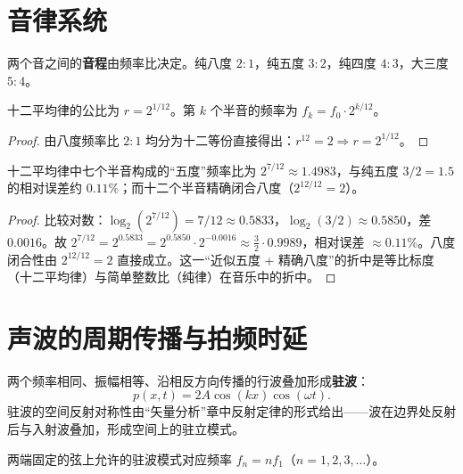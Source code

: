 \section{音律系统}

\begin{definition}[音程与频率比]\label{def:musical_interval}
两个音之间的\textbf{音程}由频率比决定。纯八度 $2:1$，纯五度 $3:2$，纯四度 $4:3$，大三度 $5:4$。
\end{definition}

\begin{theorem}[十二平均律的数学结构]\label{thm:equal_temperament}
十二平均律的公比为 $r = 2^{1/12}$。第 $k$ 个半音的频率为 $f_k = f_0 \cdot 2^{k/12}$。
\end{theorem}

\begin{proof}
由八度频率比 $2:1$ 均分为十二等份直接得出：$r^{12} = 2 \Rightarrow r = 2^{1/12}$。
\end{proof}

\begin{lemma}[十二平均律对纯五度的逼近]\label{ch22_fifth_approximation}
十二平均律中七个半音构成的“五度”频率比为 $2^{7/12} \approx 1.4983$，与纯五度 $3/2 = 1.5$ 的相对误差约 $0.11\%$；而十二个半音精确闭合八度（$2^{12/12} = 2$）。
\end{lemma}

\begin{proof}
比较对数：$\log_2(2^{7/12}) = 7/12 \approx 0.5833$，$\log_2(3/2) \approx 0.5850$，差 $0.0016$。故 $2^{7/12} = 2^{0.5833} = 2^{0.5850} \cdot 2^{-0.0016} \approx \frac{3}{2} \cdot 0.9989$，相对误差 $\approx 0.11\%$。八度闭合性由 $2^{12/12}=2$ 直接成立。这一“近似五度 + 精确八度”的折中是等比标度（十二平均律）与简单整数比（纯律）在音乐中的折中。
\end{proof}

\section{声波的周期传播与拍频时延}

\begin{definition}[驻波]\label{def:standing_wave}
两个频率相同、振幅相等、沿相反方向传播的行波叠加形成\textbf{驻波}：
\[
p(x, t) = 2A\cos(kx)\cos(\omega t).
\]
驻波的空间反射对称性由“矢量分析”章中反射定律的形式给出——波在边界处反射后与入射波叠加，形成空间上的驻立模式。
\end{definition}

\begin{proposition}[弦乐器的谐波系列]\label{prop:string_harmonics}
两端固定的弦上允许的驻波模式对应频率 $f_n = n f_1$（$n = 1, 2, 3, \dots$）。
\end{proposition}

